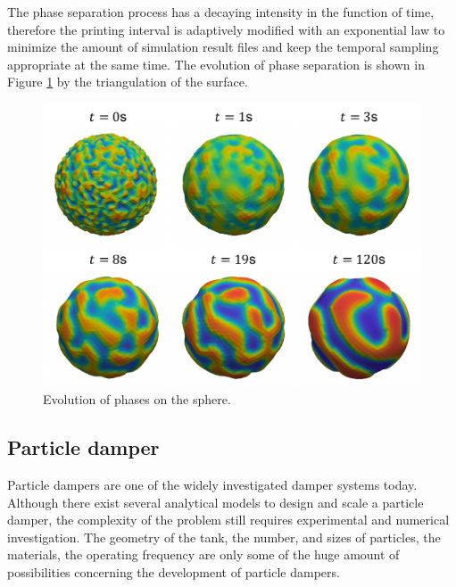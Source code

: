 \documentclass[a4paper,12pt,openany]{book}
\theoremstyle{break}
\begin{document}
The phase separation process has a decaying intensity in the function of time, therefore the printing interval is adaptively modified with an exponential law to minimize the amount of simulation result files and keep the temporal sampling appropriate at the same time. The evolution of phase separation is shown in Figure \ref{fig:cahnhilliard_result} by the triangulation of the surface.
\begin{figure}[H]
  \includegraphics[scale=0.6]{cahnhilliard_result.pdf}
  \centering
  \caption{Evolution of phases on the sphere.}
  \label{fig:cahnhilliard_result}
\end{figure}\vspace*{3pt}


\subsection{Particle damper}
Particle dampers are one of the widely investigated damper systems today. Although there exist several analytical models to design and scale a particle damper, the complexity of the problem still requires experimental and numerical investigation. The geometry of the tank, the number, and sizes of particles, the materials, the operating frequency are only some of the huge amount of possibilities concerning the development of particle dampers.
\end{document}
